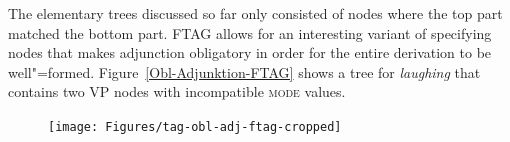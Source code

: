 \largerpage
The elementary trees discussed so far only consisted of nodes where the top part matched the bottom part. FTAG allows for an interesting variant of specifying 
nodes that makes adjunction obligatory\label{page-feature-based-tag-oa} in order for the entire derivation to be well"=formed.
Figure~\vref{Obl-Adjunktion-FTAG} shows a tree for \emph{laughing} that contains two VP nodes with incompatible \textsc{mode} values.
\begin{figure}
\centerline{%
\texttt{[image: Figures/tag-obl-adj-ftag-cropped]}
}

\end{figure}
